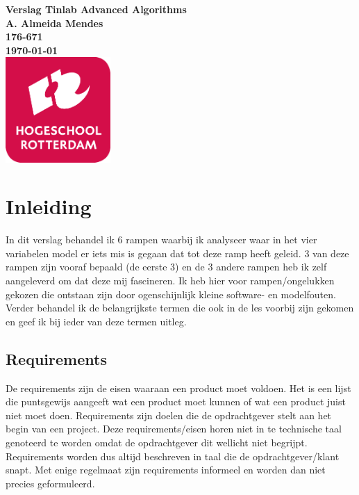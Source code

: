 \documentclass{article}
\begin{document}
\sffamily
\begin{titlepage}
  \centering
    \vfill
    {\bfseries\Huge
      Verslag Tinlab Advanced Algorithms \\
        \vskip2cm
      }
      {\bfseries\Large
        A. Almeida Mendes\\
      }
      {
        \bfseries\normalsize
        176-671\\
        \vskip1cm
        \today\\
    }    
    \vfill
    \includegraphics[width=4cm]{logohr.png} %
    \vfill
    \vfill
\end{titlepage}
\newpage
\tableofcontents

\newpage
\section{Inleiding}
In dit verslag behandel ik 6 rampen waarbij ik analyseer waar in het vier variabelen model er iets mis is gegaan dat tot deze ramp heeft geleid. 3 van deze rampen zijn vooraf bepaald (de eerste 3) en de 3 andere rampen heb ik zelf aangeleverd om dat deze mij fascineren. Ik heb hier voor rampen/ongelukken gekozen die ontstaan zijn door ogenschijnlijk kleine software- en modelfouten. Verder behandel ik de belangrijkste termen die ook in de les voorbij zijn gekomen en geef ik bij ieder van deze termen uitleg.

\subsection{Requirements}
De requirements zijn de eisen waaraan een product moet voldoen. Het is een lijst die puntsgewijs aangeeft wat een product moet kunnen of wat een product juist niet moet doen. Requirements zijn doelen die de opdrachtgever stelt aan het begin van een project. Deze requirements/eisen horen niet in te technische taal genoteerd te worden omdat de opdrachtgever dit wellicht niet begrijpt. Requirements worden dus altijd beschreven in taal die de opdrachtgever/klant snapt. Met enige regelmaat zijn requirements informeel en worden dan niet precies geformuleerd.
\end{document}
